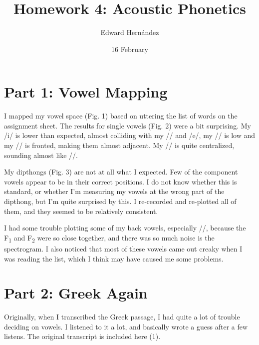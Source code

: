 \documentclass[doc,12pt]{apa6}
\begin{document}
\title{Homework 4: Acoustic Phonetics}
\author{Edward Hern\'{a}ndez}
\date{16 February}
\maketitle

\section{Part 1: Vowel Mapping}

I mapped my vowel space (Fig. 1) based on uttering the list of words on the
assignment sheet. The results for single vowels (Fig. 2) were a bit surprising.
My /i/ is lower than expected, almost colliding with my // and /e/,
my // is low and my // is fronted, making them almost
adjacent.  My // is quite centralized, sounding almost like
//.

My dipthongs (Fig. 3) are not at all what I expected. Few of the component
vowels appear to be in their correct positions. I do not know whether this is
standard, or whether I'm measuring my vowels at the wrong part of the dipthong,
but I'm quite surprised by this. I re-recorded and re-plotted all of them, and
they seemed to be relatively consistent.

I had some trouble plotting some of my back vowels, especially //,
because the F\textsubscript{1} and F\textsubscript{2} were so close together,
and there was so much noise is the spectrogram. I also noticed that most of
these vowels came out creaky when I was reading the list, which I think may
have caused me some problems.

\section{Part 2: Greek Again}

Originally, when I transcribed the Greek passage, I had quite a lot of trouble
deciding on vowels. I listened to it a lot, and basically wrote a guess after a
few listens. The original transcript is included here (1).

\begin{exe}
	\ex {}
\end{exe}
\end{document}
